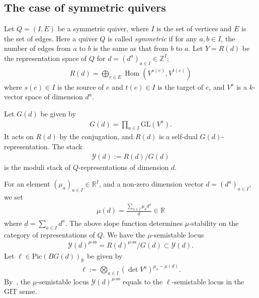 \documentclass [11pt,oneside,a4paper,mathscr]{amsart}
\theoremstyle{definition}
\newcommand{\Y}{\mathcal{Y}}
\newcommand{\Hom}{\operatorname{Hom}}
\begin{document}
\subsection{The case of symmetric quivers}\label{subsec:sQ}
    Let $Q=(I, E)$ be a symmetric quiver, 
    where $I$ is the set of vertices and $E$ is the set of edges. 
    Here a quiver $Q$ is called \textit{symmetric} if for any $a, b \in I$, 
    the number of edges from $a$ to $b$ is the same as that from $b$ to $a$. 
    Let 
    $Y=R(d)$ be the representation space of $Q$ for $d=(d^a)_{a\in I} \in \mathbb{Z}^I$;
    \begin{align*}
        R(d)=\bigoplus_{e \in E} \Hom(V^{s(e)}, V^{t(e)})
    \end{align*}
    where $s(e) \in I$ is the source of $e$ and $t(e) \in I$ is the target
    of $e$, and $V^a$ is a $k$-vector space of dimension $d^a$. 
    
    Let $G(d)$ be given by 
    \begin{align*}
        G(d)=\prod_{a\in I} \mathrm{GL}(V^a). 
    \end{align*}
    It acts on $R(d)$ by the conjugation, and $R(d)$ is a self-dual $G(d)$-representation. 
The stack 
\begin{align*}\mathcal{Y}(d):=R(d)/G(d)
\end{align*}
is the moduli stack of $Q$-representations of dimension $d$. 

 For an element 
$(\mu_a)_{a\in I} \in \mathbb{R}^I$, and 
a non-zero dimension vector $d=(d^a)_{a \in I}$, we set 
\begin{align*}
    \mu(d)=\frac{\sum_{a\in I}\mu_a d^a}{\underline{d}} \in \mathbb{R}
\end{align*}
where $\underline{d}=\sum_{a\in I}d^a$. 
The above slope function determines $\mu$-stability on the category of 
representations of $Q$. 
We have the $\mu$-semistable locus 
\begin{align*}
    \Y(d)^{\mu\text{-ss}}=R(d)^{\mu\text{-ss}}/G(d) \subset \Y(d). 
\end{align*}
Let $\ell \in \mathrm{Pic}(BG(d))_{\mathbb{R}}$ be given by 
\begin{align*}
    \ell :=\bigotimes_{a \in I} (\det V^a)^{\mu_a-\mu(d)}. 
\end{align*}
By~\cite{Kin}, the $\mu$-semistable locus 
$\Y(d)^{\mu\text{-ss}}$ equals to the $\ell$-semistable locus 
in the GIT sense. 
\end{document}

